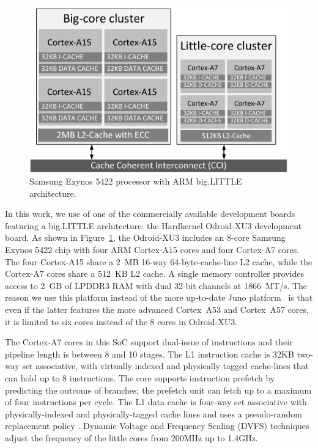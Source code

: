 \begin{figure}[t]
        \centering
        \includegraphics[width=\columnwidth]{figures/block_diagram.pdf}%
        \caption{Samsung Exynos 5422 processor with ARM big.LITTLE architecture.}%
        \label{fig:big-little-diagram}%
        \vspace{-0.56cm}
\end{figure}

In this work, we use of one of the commercially available development boards featuring a big.LITTLE architecture: the Hardkernel Odroid-XU3 development board. As shown in Figure~\ref{fig:big-little-diagram}, the Odroid-XU3 includes an 8-core Samsung Exynos 5422 chip with four ARM Cortex-A15 cores and four Cortex-A7 cores. The four Cortex-A15 share a 2~MB 16-way 64-byte-cache-line L2 cache, while the Cortex-A7 cores share a 512~KB L2 cache. A single memory controller provides access to 2~GB of LPDDR3 RAM with dual 32-bit channels at 1866~MT/s. The reason we use this platform instead of the more up-to-date Juno platform~\cite{Juno} is that even if the latter features the more advanced Cortex~A53 and Cortex~A57 cores, it is limited to six cores instead of the 8 cores in Odroid-XU3.


The Cortex-A7 cores in this SoC support dual-issue of instructions and their pipeline length is between 8 and 10 stages. The L1 instruction cache is 32KB two-way set associative, with virtually indexed and physically tagged cache-lines that can hold up to 8 instructions. The core supports instruction prefetch by predicting the outcome of branches; the prefetch unit can fetch up to a maximum of four instructions per cycle. The L1 data cache is four-way set associative with physically-indexed and physically-tagged cache lines and uses a pseudo-random replacement policy \cite{TRM_A7}. Dynamic Voltage and Frequency Scaling (DVFS) techniques adjust the frequency of the little cores from 200MHz up to 1.4GHz.

